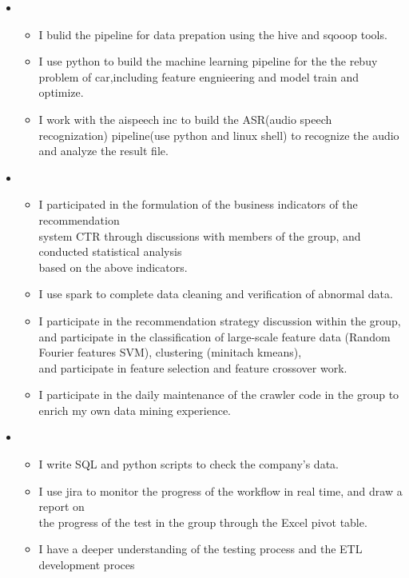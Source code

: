   \begin{itemize}[leftmargin=*]
    \item
           {\small
      \begin{itemize}
      \item I bulid the pipeline for  data prepation using the hive and sqooop tools.
      \item I use python to build the machine learning pipeline for the the rebuy problem of car,including feature 		       engnieering and model train and optimize.
	  \item I work with the aispeech inc to build the ASR(audio speech recognization) pipeline(use python and linux shell) to recognize the audio and analyze the result file. 
            \end{itemize}

             }
    
        \item
           {\small
      \begin{itemize}
      \item I participated in the formulation of the business indicators of the recommendation \\ system CTR through discussions with members of the group, and conducted statistical analysis \\based on the above indicators.
         \item I use spark to complete data cleaning and verification of abnormal data.
          \item I participate in the recommendation strategy discussion within the group, and participate in the classification of large-scale feature data (Random Fourier features SVM), clustering (minitach kmeans), \\ and participate in feature selection and feature crossover work.
           \item I participate in the daily maintenance of the crawler code in the group to enrich my own data mining experience.

            \end{itemize}

             }
     \item
        {\small
      \begin{itemize}
      \item I write SQL and python scripts to check the company's data.
        \item I use jira to monitor the progress of the workflow in real time, and draw a report on \\the progress of  the test in the group through the Excel pivot table.
         \item I have a deeper understanding of the testing process and the ETL development proces
         
       \end{itemize}
       }
             
  \end{itemize}
